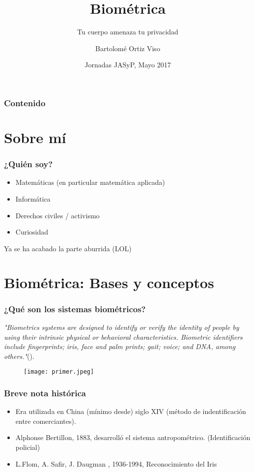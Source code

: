 \documentclass{beamer}
\title[Biométrica y privacidad] %
{Biométrica}
\subtitle{ Tu cuerpo amenaza tu privacidad}
\author[Bartolomé Ortiz Viso] %
{Bartolomé Ortiz Viso}
\institute[VFU] %
{
  
  Interferencias\\
 \and
  ETSIIT, Universidad de Granada
}
\date[12/05/2017] %
{Jornadas JASyP, Mayo 2017}
\begin{document}
\frame{\titlepage}


\begin{frame}
\frametitle{Contenido}
\tableofcontents
\end{frame}


\section{Sobre mí}

\begin{frame}
\frametitle{¿Quién soy?}

\begin{itemize}
    \item<1-> Matemáticas (en particular matemática aplicada) \pause
    \item<2-> Informática \pause
    \item<3-> Derechos civiles / activismo \pause
    \item<4-> Curiosidad \pause
\end{itemize} 
Ya se ha acabado la parte aburrida (LOL)
\end{frame}


\section{Biométrica: Bases y conceptos}
\begin{frame}
\frametitle{¿Qué son los sistemas biométricos?}
\textit{"Biometrics systems are designed to identify or verify the identity of people by using their intrinsic physical or behavioral characteristics. Biometric identifiers include fingerprints; iris, face and palm prints; gait; voice; and DNA, among others."}(\citeauthor{EFF}). 
\begin{figure}
\texttt{[image: primer.jpeg]}
\centering
\end{figure}
\end{frame}

\begin{frame}
\frametitle{Breve nota histórica}

\begin{itemize}
    \item<1-> Era utilizada en China (mínimo desde) siglo XIV (método de indentificación entre comerciantes).
    \item<2->  Alphonse Bertillon, 1883, desarrolló el sistema antropométrico. (Identificación policial) 
    \item<3-> L.Flom, A. Safir, J. Daugman , 1936-1994, Reconocimiento del Iris
\end{itemize}
\end{frame}
\end{document}
